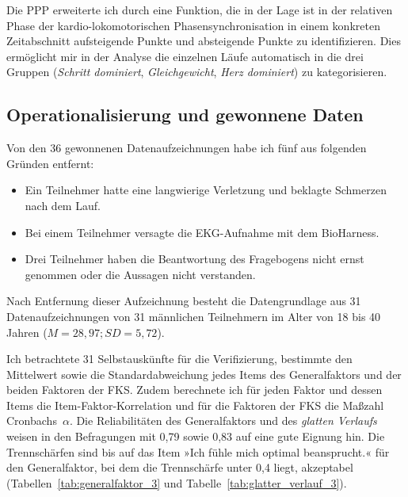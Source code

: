 Die \ac{PPP} erweiterte ich durch eine Funktion, die in der Lage ist in der relativen Phase der kardio-lokomotorischen Phasensynchronisation in einem konkreten Zeitabschnitt aufsteigende Punkte und absteigende Punkte zu identifizieren. Dies ermöglicht mir in der Analyse die einzelnen Läufe automatisch in die drei Gruppen (\emph{Schritt dominiert}, \emph{Gleichgewicht}, \emph{Herz dominiert}) zu kategorisieren. 

\subsection{Operationalisierung und gewonnene Daten} 

\label{sub:operationalisierung_und_gewonnene_daten_5_3}

Von den 36 gewonnenen Datenaufzeichnungen habe ich fünf aus folgenden Gründen entfernt: 
\begin{itemize}
	
	\item Ein Teilnehmer hatte eine langwierige Verletzung und beklagte Schmerzen nach dem Lauf.
	
	\item Bei einem Teilnehmer versagte die \ac{EKG}-Aufnahme mit dem BioHarness.
	
	\item Drei Teilnehmer haben die Beantwortung des Fragebogens nicht ernst genommen oder die Aussagen nicht verstanden. 
\end{itemize}

Nach Entfernung dieser Aufzeichnung besteht die Datengrundlage aus 31 Datenaufzeichnungen von 31 männlichen Teilnehmern im Alter von 18 bis 40 Jahren ($M = 28{,}97; SD = 5{,}72$).

Ich betrachtete 31 Selbstauskünfte für die Verifizierung, bestimmte den Mittelwert sowie die Standardabweichung jedes Items des Generalfaktors und der beiden Faktoren der \ac{FKS}. Zudem berechnete ich für jeden Faktor und dessen Items die Item-Faktor-Korrelation und für die Faktoren der \ac{FKS} die Maßzahl Cronbachs~$\alpha$. Die Reliabilitäten des Generalfaktors und des \emph{glatten Verlaufs} weisen in den Befragungen mit 0,79 sowie 0,83 auf eine gute Eignung hin. Die Trennschärfen sind bis auf das Item »Ich fühle mich optimal beansprucht.« für den Generalfaktor, bei dem die Trennschärfe unter 0,4 liegt, akzeptabel (Tabellen~\ref{tab:generalfaktor_3} und Tabelle~\ref{tab:glatter_verlauf_3}).

